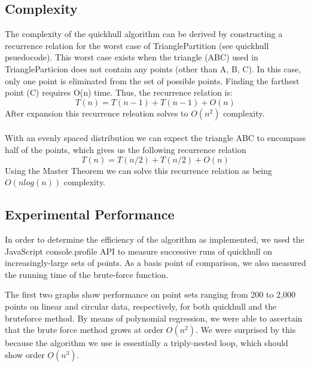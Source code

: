 \documentclass[11pt]{article}
\begin{document}
\subsection{Complexity}
The complexity of the quickhull algorithm can be derived by constructing a recurrence relation for the worst case of TrianglePartition (see quickhull psuedocode). This worst case exists when the triangle (ABC) used in TriangleParticion does not contain any points (other than A, B, C). In this case, only one point is eliminated from the set of possible points. Finding the farthest point (C) requires O(n) time. Thus, the recurrence relation is:
\[ T(n) = T(n - 1) + T(n - 1) + O(n) \]
After expansion this recurrence releation solves to $O(n^2)$ complexity.
\\
\\
With an evenly spaced distribution we can expect the triangle ABC to encompass half of the points, which gives us the following recurrence relation
\[ T(n) = T(n / 2) + T(n / 2) + O(n) \]
Using the Master Theorem we can solve this recurrence relation as being $O(n log(n))$ complexity.

\subsection{Experimental Performance}
In order to determine the efficiency of the algorithm as implemented, we used the JavaScript console.profile API to measure successive runs of quickhull on increasingly-large sets of points. As a basis point of comparison, we also measured the running time of the brute-force function.

The first two graphs show performance on point sets ranging from 200 to 2,000 points on linear and circular data, respectively, for both quickhull and the bruteforce method. By means of polynomial regression, we were able to ascertain that the brute force method grows at order $O(n^2)$. We were surprised by this because the algorithm we use is essentially a triply-nested loop, which should show order $O(n^3)$.
\end{document}
